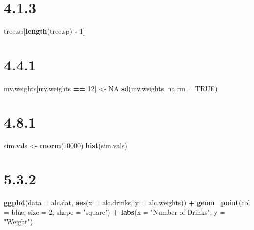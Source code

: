\documentclass[
]{krantz}
\makeatletter
\newenvironment{Shaded}{\begin{snugshade}}{\end{snugshade}}
\newcommand{\DataTypeTok}[1]{\textcolor[rgb]{0.27,0.27,0.27}{#1}}
\newcommand{\DecValTok}[1]{\textcolor[rgb]{0.06,0.06,0.06}{#1}}
\newcommand{\KeywordTok}[1]{\textcolor[rgb]{0.27,0.27,0.27}{\textbf{#1}}}
\newcommand{\NormalTok}[1]{#1}
\newcommand{\OperatorTok}[1]{\textcolor[rgb]{0.43,0.43,0.43}{\textbf{#1}}}
\newcommand{\OtherTok}[1]{\textcolor[rgb]{0.37,0.37,0.37}{#1}}
\newcommand{\StringTok}[1]{\textcolor[rgb]{0.5,0.5,0.5}{#1}}
\newenvironment{kframe}{%
\medskip{}
\setlength{\fboxsep}{.8em}
 \def\at@end@of@kframe{}%
 \ifinner\ifhmode%
  \def\at@end@of@kframe{\end{minipage}}%
  \begin{minipage}{\columnwidth}%
 \fi\fi%
 \def\FrameCommand##1{\hskip\@totalleftmargin \hskip-\fboxsep
 \colorbox{shadecolor}{##1}\hskip-\fboxsep
     \hskip-\linewidth \hskip-\@totalleftmargin \hskip\columnwidth}%
 \MakeFramed {\advance\hsize-\width
   \@totalleftmargin\z@ \linewidth\hsize
   \@setminipage}}%
 {\par\unskip\endMakeFramed%
 \at@end@of@kframe}
\renewenvironment{Shaded}{\begin{kframe}}{\end{kframe}}
\makeatother
\begin{document}
\hypertarget{section-1}{%
\section*{4.1.3}\label{section-1}}


\begin{Shaded}
\begin{Highlighting}[]
\NormalTok{tree.sp[}\KeywordTok{length}\NormalTok{(tree.sp) }\OperatorTok{{-}}\StringTok{ }\DecValTok{1}\NormalTok{]}
\end{Highlighting}
\end{Shaded}

\hypertarget{section-2}{%
\section*{4.4.1}\label{section-2}}


\begin{Shaded}
\begin{Highlighting}[]
\NormalTok{my.weights[my.weights }\OperatorTok{==}\StringTok{ }\DecValTok{12}\NormalTok{] \textless{}{-}}\StringTok{ }\OtherTok{NA}
\KeywordTok{sd}\NormalTok{(my.weights, }\DataTypeTok{na.rm =} \OtherTok{TRUE}\NormalTok{)}
\end{Highlighting}
\end{Shaded}

\hypertarget{section-3}{%
\section*{4.8.1}\label{section-3}}


\begin{Shaded}
\begin{Highlighting}[]
\NormalTok{sim.vals \textless{}{-}}\StringTok{ }\KeywordTok{rnorm}\NormalTok{(}\DecValTok{10000}\NormalTok{)}
\KeywordTok{hist}\NormalTok{(sim.vals)}
\end{Highlighting}
\end{Shaded}

\hypertarget{section-4}{%
\section*{5.3.2}\label{section-4}}


\begin{Shaded}
\begin{Highlighting}[]
\KeywordTok{ggplot}\NormalTok{(}\DataTypeTok{data =}\NormalTok{ alc.dat, }\KeywordTok{aes}\NormalTok{(}\DataTypeTok{x =}\NormalTok{ alc.drinks, }\DataTypeTok{y =}\NormalTok{ alc.weights)) }\OperatorTok{+}\StringTok{ }
\StringTok{  }\KeywordTok{geom\_point}\NormalTok{(}\DataTypeTok{col =} \StringTok{\textquotesingle{}blue\textquotesingle{}}\NormalTok{, }\DataTypeTok{size =} \DecValTok{2}\NormalTok{, }\DataTypeTok{shape =} \StringTok{"square"}\NormalTok{) }\OperatorTok{+}\StringTok{ }
\StringTok{  }\KeywordTok{labs}\NormalTok{(}\DataTypeTok{x =} \StringTok{"Number of Drinks"}\NormalTok{, }
       \DataTypeTok{y =} \StringTok{"Weight"}\NormalTok{)}
\end{Highlighting}
\end{Shaded}
\end{document}
